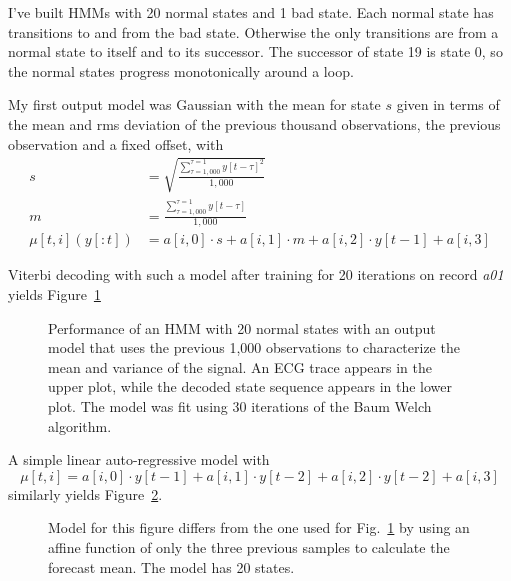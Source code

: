 \documentclass[12pt]{article}
\begin{document}
I've built HMMs with 20 normal states and 1 bad state.  Each normal
state has transitions to and from the bad state.  Otherwise the only
transitions are from a normal state to itself and to its successor.
The successor of state 19 is state 0, so the normal states progress
monotonically around a loop.

My first output model was Gaussian with the mean for state $s$ given
in terms of the mean and rms deviation of the previous thousand
observations, the previous observation and a fixed offset, with
\begin{align*}
  s &= \sqrt{\frac{\sum_{\tau=1,000}^{\tau=1} y[t-\tau]^2}{1,000}} \\
  m &=  \frac{\sum_{\tau=1,000}^{\tau=1} y[t-\tau]}{1,000} \\
  \mu[t,i](y[:t]) &= a[i,0] \cdot s + a[i,1] \cdot m + a[i,2] \cdot
  y[t-1] + a[i,3]
\end{align*}

Viterbi decoding with such a model after training for 20 iterations on
record \emph{a01} yields Figure~\ref{fig:modelAR1k20}

\begin{figure}
  \centering
    \caption{Performance of an HMM with 20 normal states with an
      output model that uses the previous 1,000 observations to
      characterize the mean and variance of the signal.  An ECG trace
      appears in the upper plot, while the decoded state sequence
      appears in the lower plot.  The model was fit using 30
      iterations of the Baum Welch algorithm.}
  \label{fig:modelAR1k20}
\end{figure}

A simple linear auto-regressive model with
\begin{equation*}
  \mu[t,i] = a[i,0] \cdot y[t-1] + a[i,1] \cdot y[t-2] + a[i,2] \cdot
  y[t-2]  + a[i,3]
\end{equation*}
similarly yields Figure~\ref{fig:modelAR3_20}.

\begin{figure}
  \centering
    \caption{Model for this figure differs from the one used for
      Fig.~\ref{fig:modelAR1k20} by using an affine function of only
      the three previous samples to calculate the forecast mean.  The
      model has 20 states.}
  \label{fig:modelAR3_20}
\end{figure}
\end{document}
